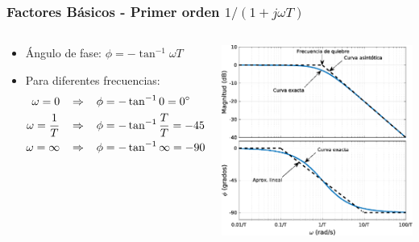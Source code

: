 \documentclass[aspectratio=169]{beamer}
\theoremstyle{definition}
\theoremstyle{plain}
\theoremstyle{remark}
\begin{document}
\begin{frame}[<+->]\frametitle{Factores Básicos - Primer orden $1/(1+j \omega T)$}
\vspace*{8mm}
\begin{columns}
	\begin{column}{0.5\textwidth}
	\begin{itemize}
		\item Ángulo de fase: $\phi = -\tan^{-1} \omega T$
		\item Para diferentes frecuencias:
		\begin{align*}
			\omega = 0 \hspace*{3mm} &\Rightarrow \hspace*{3mm} \phi = - \tan^{-1} 0 = \ang{0}\\
			\omega = \frac{1}{T} \hspace*{3mm} &\Rightarrow \hspace*{3mm} \phi = -\tan^{-1}\frac{T}{T} = -\ang{45}\\
			\omega = \infty \hspace*{3mm} &\Rightarrow \hspace*{3mm} \phi = - \tan^{-1} \infty = -\ang{90}
		\end{align*}
	\end{itemize}
	\end{column}
	\begin{column}{0.5\textwidth}
	\centering
	\includegraphics[width=6.5cm]{images/bodeFirstOrderIntegral.eps}
	\end{column}
\end{columns}
\end{frame}
\end{document}

